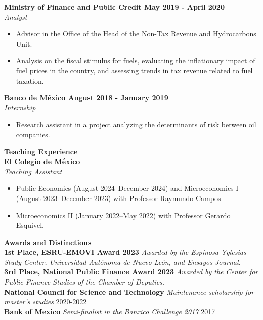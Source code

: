 \documentclass{article}
\begin{document}
\noindent \textbf{Ministry of Finance and Public Credit \hfill  May 2019 -   April 2020}  \\
\textit{Analyst} 
\begin{itemize}[noitemsep,nolistsep,leftmargin=*]
\item {Advisor in the Office of the Head of the Non-Tax Revenue and Hydrocarbons Unit.} 
\item {Analysis on the fiscal stimulus for fuels, evaluating the inflationary impact of fuel prices in the country, and assessing trends in tax revenue related to fuel taxation. } 
\end{itemize}


\noindent \textbf{Banco de México \hfill  August 2018 -  January 2019}  \\
\textit{Internship} 
\begin{itemize}[noitemsep,nolistsep,leftmargin=*]
\item {Research assistant in a project analyzing the determinants of risk between oil companies.} \\
\end{itemize}

\noindent \textbf{\underline{Teaching Experience}} \\
\noindent \textbf{El Colegio de México} \\   \textit{Teaching Assistant}  
\begin{itemize}[noitemsep,nolistsep,leftmargin=*]

\item {Public Economics (August 2024–December 2024) and Microeconomics I (August 2023–December 2023) with Professor Raymundo Campos} 
\item { Microeconomics II (January 2022–May 2022) with Professor Gerardo Esquivel.} \\
\end{itemize}








\noindent \textbf{\underline{Awards and Distinctions}} \\
\noindent \textbf{1st Place, ESRU-EMOVI Award 2023} \textit{Awarded by the Espinosa Yglesias Study Center, Universidad Autónoma de Nuevo León, and Ensayos Journal.} \\
\noindent \textbf{3rd Place, National Public Finance Award 2023} \textit{Awarded by the Center for Public Finance Studies of the Chamber of Deputies.} \\
\noindent \textbf{National Council for Science and Technology} \textit{Maintenance scholarship for master's studies} \hfill 2020-2022 \\
\noindent \textbf{Bank of Mexico} \textit{Semi-finalist in the Banxico Challenge 2017} \hfill 2017 \\
\end{document}
